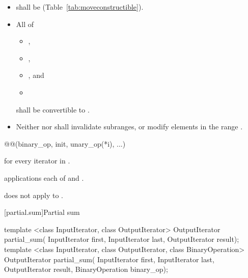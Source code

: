 \begin{itemdescr}
\pnum
\requires
\begin{itemize}
\item {} shall be  (Table~\ref{tab:moveconstructible}).
\item All of
\begin{itemize}
\item {},
\item {},
\item {}, and
\item {}
\end{itemize}
shall be convertible to .
\item Neither  nor  shall invalidate subranges,
or modify elements in the range .
\end{itemize}

\pnum
\returns
\begin{codeblock}
@@(binary_op, init, unary_op(*i), ...)
\end{codeblock}
for every iterator  in .

\pnum
\complexity
{} applications each of  and
.

\pnum
\begin{note}
 does not apply  to .
\end{note}
\end{itemdescr}

[partial.sum]{Partial sum}

%
\begin{itemdecl}
template <class InputIterator, class OutputIterator>
  OutputIterator partial_sum(
    InputIterator first, InputIterator last,
    OutputIterator result);
template <class InputIterator, class OutputIterator, class BinaryOperation>
  OutputIterator partial_sum(
    InputIterator first, InputIterator last,
    OutputIterator result, BinaryOperation binary_op);
\end{itemdecl}

